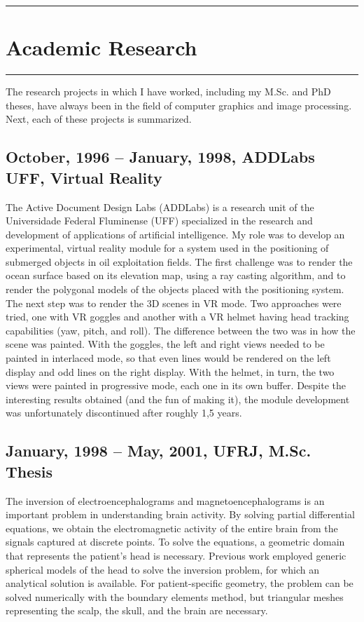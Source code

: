 \documentclass[a4paper]{article}
\begin{document}
\pagebreak

\hrule
\section{Academic Research}
\hrule
\medskip
\medskip

The research projects in which I have worked, including my M.Sc. and PhD theses, have always been in the field of computer graphics and image processing. Next, each of these projects is summarized.

\subsection{October, 1996 -- January, 1998, ADDLabs UFF, Virtual Reality}

The Active Document Design Labs (ADDLabs) is a research unit of the Universidade Federal Fluminense (UFF) specialized in the research and development of applications of artificial intelligence. My role was to develop an experimental, virtual reality module for a system used in the positioning of submerged objects in oil exploitation fields. The first challenge was to render the ocean surface based on its elevation map, using a ray casting algorithm, and to render the polygonal models of the objects placed with the positioning system. The next step was to render the 3D scenes in VR mode. Two approaches were tried, one with VR goggles and another with a VR helmet having head tracking capabilities (yaw, pitch, and roll). The difference between the two was in how the scene was painted. With the goggles, the left and right views needed to be painted in interlaced mode, so that even lines would be rendered on the left display and odd lines on the right display. With the helmet, in turn, the two views were painted in progressive mode, each one in its own buffer. Despite the interesting results obtained (and the fun of making it), the module development was unfortunately discontinued after roughly 1,5 years.

\subsection{January, 1998 -- May, 2001, UFRJ, M.Sc. Thesis}

The inversion of electroencephalograms and magnetoencephalograms is an important problem in understanding brain activity. By solving partial differential equations, we obtain the electromagnetic activity of the entire brain from the signals captured at discrete points. To solve the equations, a geometric domain that represents the patient's head is necessary. Previous work employed generic spherical models of the head to solve the inversion problem, for which an analytical solution is available. For patient-specific geometry, the problem can be solved numerically with the boundary elements method, but triangular meshes representing the scalp, the skull, and the brain are necessary.
\end{document}
